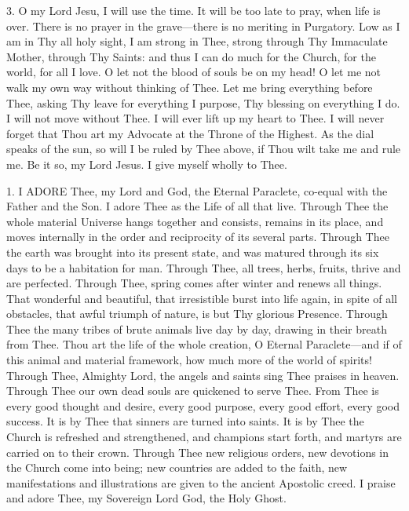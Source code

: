3. O my Lord Jesu, I will use
the time. It will be too late to pray, when life is over. There is no
prayer in the grave—there is no meriting in Purgatory. Low as I am in
Thy all holy sight, I am strong in Thee, strong through Thy Immaculate
Mother, through Thy Saints: and thus I can do much for the Church, for
the world, for all I love. O let not the blood of souls be on my head! O
let me not walk my own way without thinking of Thee. Let me bring
everything before Thee, asking Thy leave for everything I purpose, Thy
blessing on everything I do. I will not move without Thee. I will ever
lift up my heart to Thee. I will never forget that Thou art my Advocate
at the Throne of the Highest. As the dial speaks of the sun, so will I
be ruled by Thee above, if Thou wilt take me and rule me. Be it so, my
Lord Jesus. I give myself wholly to Thee.



1. I ADORE
Thee, my Lord and God, the Eternal Paraclete, co-equal with the Father
and the Son. I adore Thee as the Life of all that live. Through Thee the
whole material Universe hangs together and consists, remains in its
place, and moves internally in the order and reciprocity of its several
parts. Through Thee the earth was brought into its present state, and
was matured through its six days to be a habitation for man. Through
Thee, all trees, herbs, fruits, thrive and are perfected. Through Thee,
spring comes after winter and renews all things. That wonderful and
beautiful, that irresistible burst into life again, in spite of all
obstacles, that awful triumph of nature, is but Thy glorious Presence.
Through Thee the many tribes of brute animals live day by day, drawing
in their breath from Thee. Thou art the life of the whole creation, O
Eternal Paraclete—and if of this animal and material framework, how
much more of the world of spirits! Through Thee, Almighty Lord,
the angels and saints sing Thee praises in heaven. Through Thee our own
dead souls are quickened to serve Thee. From Thee is every good thought
and desire, every good purpose, every good effort, every good success.
It is by Thee that sinners are turned into saints. It is by Thee the
Church is refreshed and strengthened, and champions start forth, and
martyrs are carried on to their crown. Through Thee new religious
orders, new devotions in the Church come into being; new countries are
added to the faith, new manifestations and illustrations are given to
the ancient Apostolic creed. I praise and adore Thee, my Sovereign Lord
God, the Holy Ghost.

